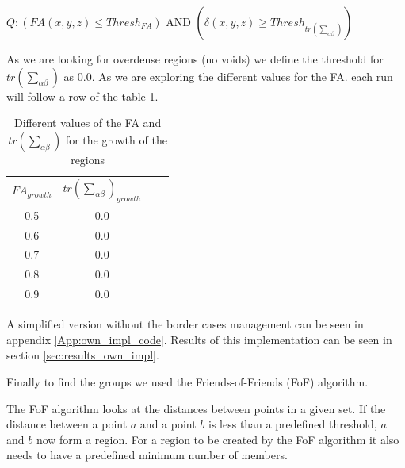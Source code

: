 \documentclass[12pt]{article}
\begin{document}
\begin{itemize}
\begin{par}
\begin{center}
$Q: \left( FA (x,y,z) \leq Thresh_{FA} \right)$ AND
$\left( \delta (x,y,z) \geq Thresh_{tr\left(\sum_{\alpha \beta}\right)} \right)$ 
\end{center}
As we are looking for overdense regions (no voids) we define the
threshold for $tr\left(\sum_{\alpha \beta}\right)$ as 0.0. As we are exploring the different
values for the FA. each run will follow a row of the table \ref{tab:search_FA_Trace}.
\end{par}

\begin{table}[ht]
    \centering
    \begin{tabular}{|c|c|c|c|}
        $FA_{growth}$ & $tr\left(\sum_{\alpha \beta}\right)_{growth}$ \\
        0.5 &  0.0 \\
        0.6 &  0.0 \\
        0.7 &  0.0 \\
        0.8 &  0.0 \\
        0.9 &  0.0 \\
    \end{tabular}
    \caption{Different values of the FA and $tr\left(\sum_{\alpha \beta}\right)$ for the growth of the regions}
    \label{tab:search_FA_Trace}
\end{table}
\FloatBarrier

\end{itemize}

\begin{par}
A simplified version without the border cases
 management can be seen in appendix \ref{App:own_impl_code}. Results of this
  implementation can be seen in section
   \ref{sec:results_own_impl}.
\end{par}

\begin{par}
Finally to find the groups we used the Friends-of-Friends (FoF) algorithm.
\end{par}
\begin{par}
The FoF algorithm looks at the distances between points in a given
set. If the distance between a point $a$ and a point $b$ is less
than a predefined threshold, $a$ and $b$ now form a region. For a
region to be created by the FoF algorithm it also needs to have a
predefined minimum number of members. 
\end{par}
\end{document}
